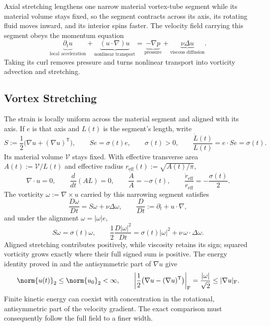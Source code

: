 
Axial stretching lengthens one narrow material vortex-tube segment while its material volume stays fixed, so the segment contracts across its axis, its rotating fluid moves inward, and its interior spins faster. The velocity field carrying this segment obeys the momentum equation
\[
  \underbrace{\partial_t u}_{\text{local acceleration}}
  +
  \underbrace{(u\cdot\nabla)u}_{\text{nonlinear transport}}
  =
  \underbrace{-\nabla p}_{\text{pressure}}
  +
  \underbrace{\nu\Delta u}_{\text{viscous diffusion}}.
\]
Taking its curl removes pressure and turns nonlinear transport into vorticity advection and stretching.

\subsection{Vortex Stretching}\label{sub:ThePerfectlyStretchingVortex}

The strain is locally uniform across the material segment and aligned with its axis. If \(e\) is that axis and \(L(t)\) is the segment's length, write
\[
  S:=\frac12\bigl(\nabla u+(\nabla u)^{\mathsf T}\bigr),
  \qquad
  Se=\sigma(t)e,
  \qquad
  \sigma(t)>0,
  \qquad
  \frac{\dot L(t)}{L(t)}
  =
  e\cdot Se
  =
  \sigma(t).
\]
Its material volume \(\mathcal V\) stays fixed. With effective transverse area \(A(t):=\mathcal V/L(t)\) and effective radius \(r_{\mathrm{eff}}(t):=\sqrt{A(t)/\pi}\),
\[
  \nabla\cdot u=0,
  \qquad
  \frac{d}{dt}(A L)=0,
  \qquad
  \frac{\dot A}{A}=-\sigma(t),
  \qquad
  \frac{\dot r_{\mathrm{eff}}}{r_{\mathrm{eff}}}
  =
  -\frac{\sigma(t)}{2}.
\]
The vorticity \(\omega:=\nabla\times u\) carried by this narrowing segment satisfies
\[
  \frac{D\omega}{Dt}
  =
  S\omega+\nu\Delta\omega,
  \qquad
  \frac{D}{Dt}
  :=
  \partial_t+u\cdot\nabla,
\]
and under the alignment \(\omega=|\omega|e\),
\[
  S\omega
  =
  \sigma(t)\omega,
  \qquad
  \frac12\frac{D|\omega|^2}{Dt}
  =
  \sigma(t)|\omega|^2
  +
  \nu\,\omega\cdot\Delta\omega.
\]
Aligned stretching contributes positively, while viscosity retains its sign; squared vorticity grows exactly where their full signed sum is positive. The energy identity proved in  and the antisymmetric part of \(\nabla u\) give
\[
  \norm{u(t)}_2
  \leq
  \norm{u_0}_2
  <\infty,
  \qquad
  \left|\frac12\bigl(\nabla u-(\nabla u)^{\mathsf T}\bigr)\right|_{\mathrm F}
  =
  \frac{|\omega|}{\sqrt2}
  \leq
  |\nabla u|_{\mathrm F}.
\]
Finite kinetic energy can coexist with concentration in the rotational, antisymmetric part of the velocity gradient. The exact comparison must consequently follow the full field to a finer width.

